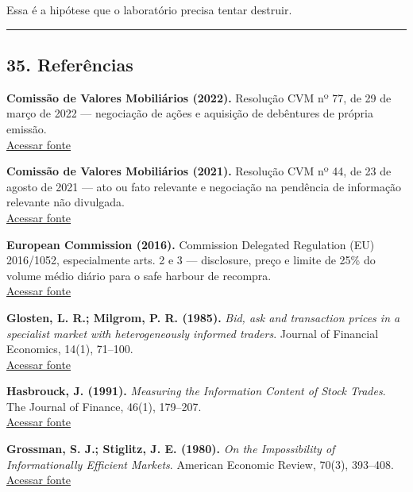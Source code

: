 \documentclass[
  a4paper,
]{article}
\begin{document}
Essa é a hipótese que o laboratório precisa tentar destruir.

\begin{center}\rule{0.5\linewidth}{0.5pt}\end{center}

\hypertarget{35-referencias}{}

\hypertarget{35-referuxeancias}{%
\subsection{35. Referências}\label{35-referuxeancias}}

\hypertarget{ref-1}{} \textbf{Comissão de Valores Mobiliários (2022).}
Resolução CVM nº 77, de 29 de março de 2022 --- negociação de ações e
aquisição de debêntures de própria emissão.\\
\href{https://conteudo.cvm.gov.br/legislacao/resolucoes/resol077.html}{Acessar
fonte}

\hypertarget{ref-2}{} \textbf{Comissão de Valores Mobiliários (2021).}
Resolução CVM nº 44, de 23 de agosto de 2021 --- ato ou fato relevante e
negociação na pendência de informação relevante não divulgada.\\
\href{https://conteudo.cvm.gov.br/legislacao/resolucoes/resol044.html}{Acessar
fonte}

\hypertarget{ref-3}{} \textbf{European Commission (2016).} Commission
Delegated Regulation (EU) 2016/1052, especialmente arts. 2 e 3 ---
disclosure, preço e limite de 25\% do volume médio diário para o safe
harbour de recompra.\\
\href{https://eur-lex.europa.eu/eli/reg_del/2016/1052}{Acessar fonte}

\hypertarget{ref-4}{} \textbf{Glosten, L. R.; Milgrom, P. R. (1985).}
\emph{Bid, ask and transaction prices in a specialist market with
heterogeneously informed traders}. Journal of Financial Economics,
14(1), 71--100.\\
\href{https://doi.org/10.1016/0304-405X(85)90044-3}{Acessar fonte}

\hypertarget{ref-5}{} \textbf{Hasbrouck, J. (1991).} \emph{Measuring the
Information Content of Stock Trades}. The Journal of Finance, 46(1),
179--207.\\
\href{https://doi.org/10.1111/j.1540-6261.1991.tb03749.x}{Acessar fonte}

\hypertarget{ref-6}{} \textbf{Grossman, S. J.; Stiglitz, J. E. (1980).}
\emph{On the Impossibility of Informationally Efficient Markets}.
American Economic Review, 70(3), 393--408.\\
\href{https://www.jstor.org/stable/1805228}{Acessar fonte}
\end{document}
